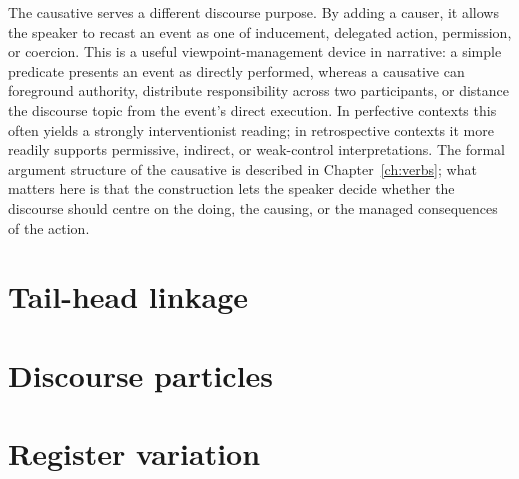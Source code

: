 The causative serves a different discourse purpose. By adding a causer, it allows the speaker to recast an event as one of inducement, delegated action, permission, or coercion. This is a useful viewpoint-management device in narrative: a simple predicate presents an event as directly performed, whereas a causative can foreground authority, distribute responsibility across two participants, or distance the discourse topic from the event's direct execution. In perfective contexts this often yields a strongly interventionist reading; in retrospective contexts it more readily supports permissive, indirect, or weak-control interpretations. The formal argument structure of the causative is described in Chapter~\ref{ch:verbs}; what matters here is that the construction lets the speaker decide whether the discourse should centre on the doing, the causing, or the managed consequences of the action.

\section{Tail-head linkage}\label{sec:tail-head}


\section{Discourse particles}\label{sec:discourse-particles}


\section{Register variation}\label{sec:register-discourse}

